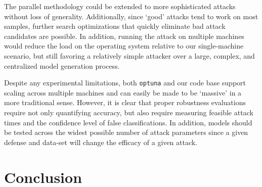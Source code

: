 \documentclass[fonts]{icst}
\begin{document}
The parallel methodology could be extended to more sophisticated attacks without loss of generality. Additionally, since `good' attacks tend to work on most samples, further search optimizations that quickly eliminate bad attack candidates are possible. In addition, running the attack on multiple machines would reduce the load on the operating system relative to our single-machine scenario, but still favoring a relatively simple attacker over a large, complex, and centralized model generation process. 

Despite any experimental limitations, both \texttt{optuna} and our code base support scaling across multiple machines and can easily be made to be `massive' in a more traditional sense. However, it is clear that proper robustness evaluations require not only quantifying accuracy, but also require measuring feasible attack times and the confidence level of false classifications. In addition, models should be tested across the widest possible number of attack parameters since a given defense and data-set will change the efficacy of a given attack. 


\section{Conclusion}
\end{document}
